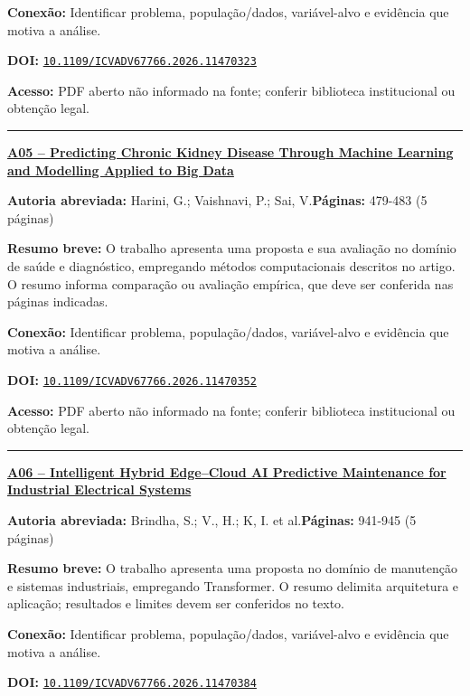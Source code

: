 \documentclass[10pt,a4paper]{article}
\begin{document}
\textbf{Conexão:} Identificar problema, população/dados, variável-alvo e evidência que motiva a análise.\par
\textbf{DOI:} \href{https://doi.org/10.1109/ICVADV67766.2026.11470323}{\nolinkurl{10.1109/ICVADV67766.2026.11470323}}\par
\textbf{Acesso:} PDF aberto não informado na fonte; conferir biblioteca institucional ou obtenção legal.\par
\noindent\rule{\textwidth}{0.35pt}
\par\medskip\noindent
{\large\bfseries\href{https://doi.org/10.1109/ICVADV67766.2026.11470352}{A05 -- Predicting Chronic Kidney Disease Through Machine Learning and Modelling Applied to Big Data}}\par\smallskip
\textbf{Autoria abreviada:} Harini, G.; Vaishnavi, P.; Sai, V.\quad \textbf{Páginas:} 479-483 (5 páginas)\par
\textbf{Resumo breve:} O trabalho apresenta uma proposta e sua avaliação no domínio de saúde e diagnóstico, empregando métodos computacionais descritos no artigo. O resumo informa comparação ou avaliação empírica, que deve ser conferida nas páginas indicadas.\par
\textbf{Conexão:} Identificar problema, população/dados, variável-alvo e evidência que motiva a análise.\par
\textbf{DOI:} \href{https://doi.org/10.1109/ICVADV67766.2026.11470352}{\nolinkurl{10.1109/ICVADV67766.2026.11470352}}\par
\textbf{Acesso:} PDF aberto não informado na fonte; conferir biblioteca institucional ou obtenção legal.\par
\noindent\rule{\textwidth}{0.35pt}
\par\medskip\noindent
{\large\bfseries\href{https://doi.org/10.1109/ICVADV67766.2026.11470384}{A06 -- Intelligent Hybrid Edge–Cloud AI Predictive Maintenance for Industrial Electrical Systems}}\par\smallskip
\textbf{Autoria abreviada:} Brindha, S.; V., H.; K, I. et al.\quad \textbf{Páginas:} 941-945 (5 páginas)\par
\textbf{Resumo breve:} O trabalho apresenta uma proposta no domínio de manutenção e sistemas industriais, empregando Transformer. O resumo delimita arquitetura e aplicação; resultados e limites devem ser conferidos no texto.\par
\textbf{Conexão:} Identificar problema, população/dados, variável-alvo e evidência que motiva a análise.\par
\textbf{DOI:} \href{https://doi.org/10.1109/ICVADV67766.2026.11470384}{\nolinkurl{10.1109/ICVADV67766.2026.11470384}}\par
\end{document}
